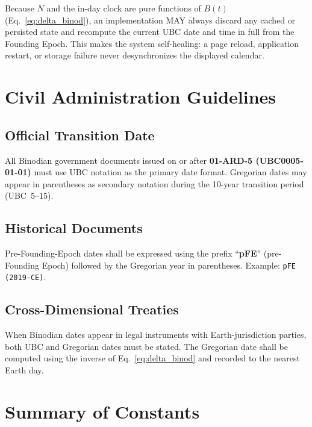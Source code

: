 \documentclass[journal,twoside]{IEEEtran}
\begin{document}
Because $N$ and the in-day clock are pure functions of $B(t)$ (Eq.~\eqref{eq:delta_binod}),
an implementation MAY always discard any cached or persisted state and recompute the
current UBC date and time in full from the Founding Epoch. This makes the system
self-healing: a page reload, application restart, or storage failure never desynchronizes
the displayed calendar.

\section{Civil Administration Guidelines}

\subsection{Official Transition Date}

All Binodian government documents issued on or after \textbf{01-ARD-5 (UBC0005-01-01)}
must use UBC notation as the primary date format.  Gregorian dates may appear in
parentheses as secondary notation during the 10-year transition period (UBC~5--15).

\subsection{Historical Documents}

Pre-Founding-Epoch dates shall be expressed using the prefix ``\textbf{pFE}''
(pre-Founding Epoch) followed by the Gregorian year in parentheses.  Example:
\texttt{pFE (2019-CE)}.

\subsection{Cross-Dimensional Treaties}

When Binodian dates appear in legal instruments with Earth-jurisdiction parties, both
UBC and Gregorian dates must be stated.  The Gregorian date shall be computed using the
inverse of Eq.~\eqref{eq:delta_binod} and recorded to the nearest Earth day.

\section{Summary of Constants}
\end{document}
